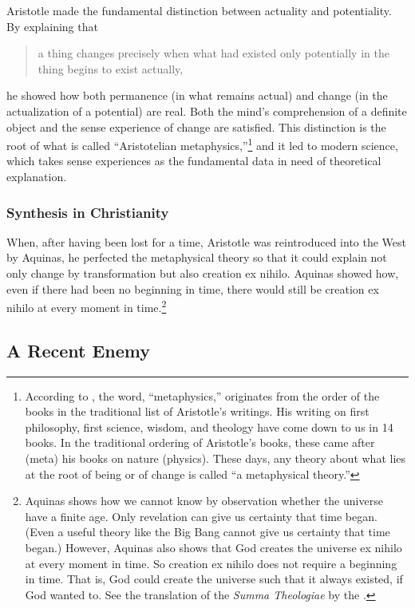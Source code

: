 \documentclass[twocolumn]{article}
\begin{document}
Aristotle made the fundamental distinction between actuality and potentiality.
By explaining that
\begin{quote}
   a thing changes precisely when what had existed only potentially in the
   thing begins to exist actually,
\end{quote}
he showed how both permanence (in what remains actual) and change (in the
actualization of a potential) are real. Both the mind's comprehension of a
definite object and the sense experience of change are satisfied.  This
distinction is the root of what is called ``Aristotelian
metaphysics,''\footnote{%
   According to \cite{vis2017}, the word, ``metaphysics,'' originates from the
   order of the books in the traditional list of Aristotle's writings.  His
   writing on first philosophy, first science, wisdom, and theology have come
   down to us in 14 books.  In the traditional ordering of Aristotle's books,
   these came after (meta) his books on nature (physics).  These days, any
   theory about what lies at the root of being or of change is called ``a
   metaphysical theory.''%
}
and it led to modern science, which takes sense experiences as the fundamental
data in need of theoretical explanation.

\subsubsection{Synthesis in Christianity}

When, after having been lost for a time, Aristotle was reintroduced into the
West by Aquinas, he perfected the metaphysical theory so that it could explain
not only change by transformation but also creation ex nihilo.  Aquinas showed
how, even if there had been no beginning in time, there would still be creation
ex nihilo at every moment in time.\footnote{%
   Aquinas shows how we cannot know by observation whether the universe have a
   finite age.  Only revelation can give us certainty that time began.  (Even a
   useful theory like the Big Bang cannot give us certainty that time began.)
   However, Aquinas also shows that God creates the universe ex nihilo at every
   moment in time.  So creation ex nihilo does not require a beginning in time.
   That is, God could create the universe such that it always existed, if God
   wanted to.  See the translation of the {\it Summa Theologiae} by the
   \citet[I, Q45, A1, and I, Q46, A1]{e1920}.
}

\subsection{A Recent Enemy}
\end{document}
